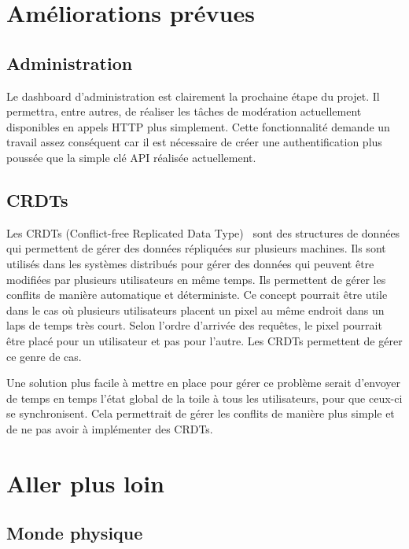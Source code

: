 
\section{Améliorations prévues}

\subsection{Administration}

Le dashboard d'administration est clairement la prochaine étape du projet. Il permettra, entre autres, de réaliser les tâches de modération actuellement disponibles en appels HTTP plus simplement. Cette fonctionnalité demande un travail assez conséquent car il est nécessaire de créer une authentification plus poussée que la simple clé API réalisée actuellement.

\subsection{CRDTs}

Les CRDTs (Conflict-free Replicated Data Type)~\cite{crdt} sont des structures de données qui permettent de gérer des données répliquées sur plusieurs machines. Ils sont utilisés dans les systèmes distribués pour gérer des données qui peuvent être modifiées par plusieurs utilisateurs en même temps. Ils permettent de gérer les conflits de manière automatique et déterministe. Ce concept pourrait être utile dans le cas où plusieurs utilisateurs placent un pixel au même endroit dans un laps de temps très court. Selon l'ordre d'arrivée des requêtes, le pixel pourrait être placé pour un utilisateur et pas pour l'autre. Les CRDTs permettent de gérer ce genre de cas.

Une solution plus facile à mettre en place pour gérer ce problème serait d'envoyer de temps en temps l'état global de la toile à tous les utilisateurs, pour que ceux-ci se synchronisent. Cela permettrait de gérer les conflits de manière plus simple et de ne pas avoir à implémenter des CRDTs.

\section{Aller plus loin}

\subsection{Monde physique}

